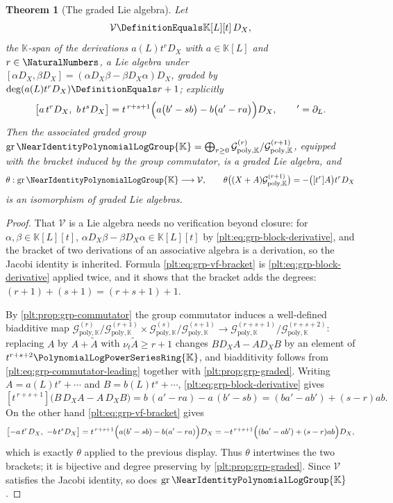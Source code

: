 \documentclass[11pt,oneside]{article}
\theoremstyle{plain}
\newtheorem{theorem}{Theorem}[section]
\theoremstyle{definition}
\theoremstyle{remark}
\newcommand{\K}{\mathbb{K}}
\newcommand{\PLpow}{\PolynomialLogPowerSeriesRing{\K}}   %
\newcommand{\Gnear}{\NearIdentityPolynomialLogGroup{\K}} %
\newcommand{\Gfilt}[1]{\mathcal{G}^{(#1)}_{\mathrm{poly},\K}}
\newcommand{\ordt}{\nu_{t}}                              %
\newcommand{\DX}{D_{X}}                                  %
\begin{document}
\begin{theorem}[The graded Lie algebra]\label{plt:thm:grp-gradedlie}
Let
\[
  \mathcal V\DefinitionEquals\K[L][t]\,\DX,
\]
the \(\K\)-span of the derivations \(a(L)t^{r}\DX\) with \(a\in\K[L]\) and
\(r\in\NaturalNumbers\), a Lie algebra under
\([\alpha\DX,\beta\DX]=(\alpha\DX\beta-\beta\DX\alpha)\DX\), graded by
\(\deg(a(L)t^r\DX)\DefinitionEquals r+1\); explicitly
\begin{equation}\label{plt:eq:grp-vf-bracket}
  \bigl[a\,t^r\DX,\ b\,t^s\DX\bigr]
  =t^{\,r+s+1}\Bigl(a\bigl(b'-sb\bigr)-b\bigl(a'-ra\bigr)\Bigr)\DX,
  \qquad{}'=\partial_L .
\end{equation}
Then the associated graded group
\(\operatorname{gr}\Gnear=\bigoplus_{r\ge0}\Gfilt{r}/\Gfilt{r+1}\), equipped
with the bracket induced by the group commutator, is a graded Lie algebra, and
\[
  \theta:\operatorname{gr}\Gnear\longrightarrow\mathcal V,
  \qquad
  \theta\bigl((X+A)\Gfilt{r+1}\bigr)=-\bigl([t^r]A\bigr)t^r\DX
\]
is an isomorphism of graded Lie algebras.
\end{theorem}

\begin{proof}
That \(\mathcal V\) is a Lie algebra needs no verification beyond closure:
for \(\alpha,\beta\in\K[L][t]\), \(\alpha\DX\beta-\beta\DX\alpha\in\K[L][t]\)
by \eqref{plt:eq:grp-block-derivative}, and the bracket of two derivations of
an associative algebra is a derivation, so the Jacobi identity is inherited.
Formula \eqref{plt:eq:grp-vf-bracket} is \eqref{plt:eq:grp-block-derivative}
applied twice, and it shows that the bracket adds the degrees:
\((r+1)+(s+1)=(r+s+1)+1\).

By \cref{plt:prop:grp-commutator} the group commutator induces a well-defined
biadditive map
\(\Gfilt{r}/\Gfilt{r+1}\times\Gfilt{s}/\Gfilt{s+1}\to
  \Gfilt{r+s+1}/\Gfilt{r+s+2}\):
replacing \(A\) by \(A+\widetilde A\) with \(\ordt\widetilde A\ge r+1\)
changes \(B\DX A-A\DX B\) by an element of \(t^{r+s+2}\PLpow\), and
biadditivity follows from \eqref{plt:eq:grp-commutator-leading} together with
\cref{plt:prop:grp-graded}.  Writing \(A=a(L)t^r+\cdots\) and
\(B=b(L)t^s+\cdots\), \eqref{plt:eq:grp-block-derivative} gives
\[
  [t^{\,r+s+1}]\bigl(B\,\DX A-A\,\DX B\bigr)
  =b\,(a'-ra)-a\,(b'-sb)
  =(ba'-ab')+(s-r)ab .
\]
On the other hand \eqref{plt:eq:grp-vf-bracket} gives
\[
  \bigl[-a\,t^r\DX,\ -b\,t^s\DX\bigr]
  =t^{\,r+s+1}\Bigl(a(b'-sb)-b(a'-ra)\Bigr)\DX
  =-t^{\,r+s+1}\Bigl((ba'-ab')+(s-r)ab\Bigr)\DX,
\]
which is exactly \(\theta\) applied to the previous display.  Thus \(\theta\)
intertwines the two brackets; it is bijective and degree preserving by
\cref{plt:prop:grp-graded}.  Since \(\mathcal V\) satisfies the Jacobi
identity, so does \(\operatorname{gr}\Gnear\).
\end{proof}
\end{document}
